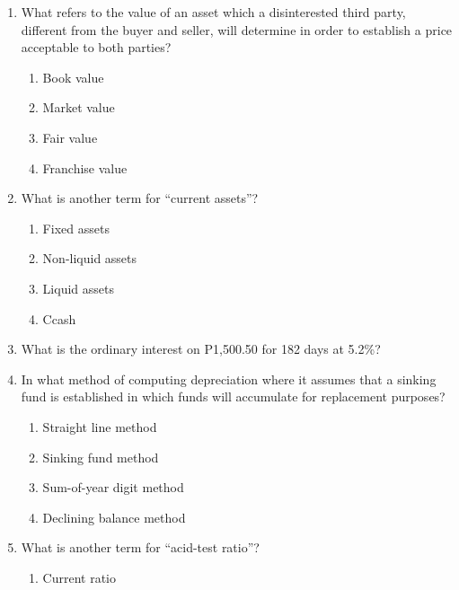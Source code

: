 \documentclass[11pt,a4paper]{article}
\begin{document}
\begin{enumerate}
\item{What refers to the value of an asset which a disinterested third party, different from the buyer and seller, will determine in order to establish a price acceptable to both parties?}
\begin{enumerate}[label=\Alph*.]
\item{Book value}
\item{Market value}
\item{Fair value}
\item{Franchise value}
\end{enumerate}
\item{What is another term for ``current assets''?
}
\begin{enumerate}[label=\Alph*.]
\item{Fixed assets}
\item{Non-liquid assets}
\item{Liquid assets}
\item{Ccash}
\end{enumerate}
\item{What is the ordinary interest on P1,500.50 for 182 days at 5.2\%?}
\\
\item{In what method of computing depreciation where it assumes that a sinking fund is established in which funds will accumulate for replacement purposes?}
\begin{enumerate}[label=\Alph*.]
\item{Straight line method}
\item{Sinking fund method}
\item{Sum-of-year digit method}
\item{Declining balance method}
\end{enumerate}
\item{What is another term for ``acid-test ratio''?
}
\begin{enumerate}[label=\Alph*.]
\item{Current ratio}

\end{enumerate}
\end{enumerate}
\end{document}

